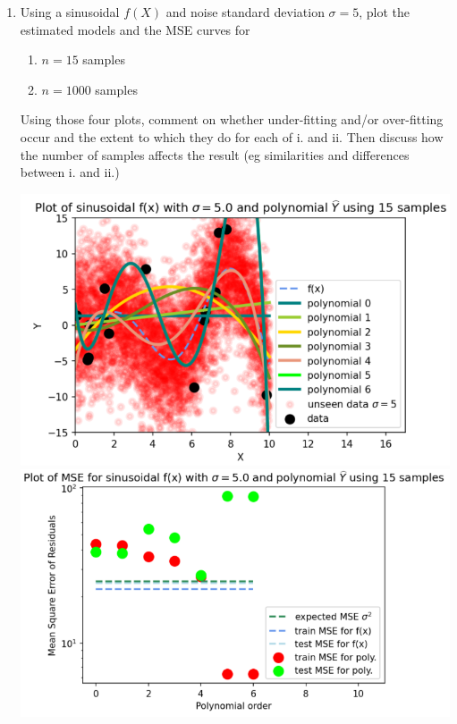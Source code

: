 \documentclass[12pt]{article}
\begin{document}
\begin{enumerate}[label=(\alph*)]
    \item Using a sinusoidal $f(X)$ and noise standard deviation $\sigma = 5$, plot the estimated models and the MSE curves for
          \begin{enumerate}[label=(\roman*)]
              \item $n = 15$ samples
              \item $ n = 1000$ samples
          \end{enumerate}
          Using those four plots, comment on whether under-fitting and/or over-fitting occur and the extent to which they do for each of i. and ii. Then discuss how the number of samples affects the result (eg similarities and differences between i. and ii.)\\
          \begin{center}
              \includegraphics[width=1\textwidth]{sinusoidal-15.png}
              \includegraphics[width=1\textwidth]{sinusoidal-MSE-15.png}

\end{center}
\end{enumerate}
\end{document}
